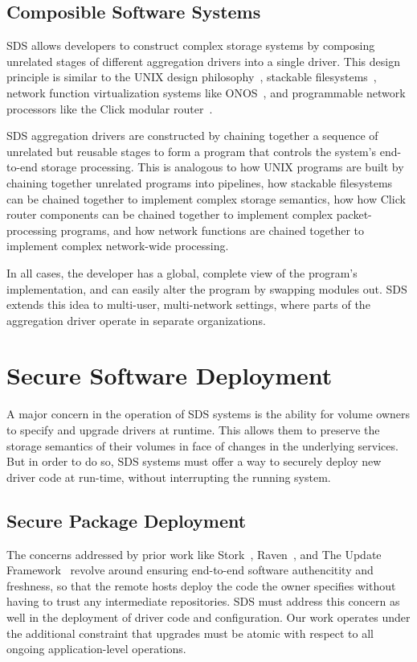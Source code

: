 \subsection{Composible Software Systems}

SDS allows developers to construct complex storage systems by composing
unrelated stages of different aggregation drivers into a single driver.
This design principle is similar to the UNIX design philosophy~\cite{unix-design-philosophy},
stackable filesystems~\cite{FUSE-stack}, network function virtualization systems
like ONOS~\cite{onos},
and programmable network processors like the Click modular router~\cite{click-modular-router}.

SDS aggregation drivers are constructed by chaining together a sequence of
unrelated but reusable stages to form a program that controls the system's
end-to-end storage processing.  This is analogous to how UNIX programs are built
by chaining together unrelated programs into pipelines, how stackable
filesystems can be chained together to implement complex storage semantics, how
how Click router components can be chained together to implement complex
packet-processing programs, and how network functions are chained together to
implement complex network-wide processing.

In all cases, the developer has a global,
complete view of the program's implementation, and can easily alter the
program by swapping modules out.  SDS extends this idea to
multi-user, multi-network settings, where parts of the
aggregation driver operate in separate organizations.

\section{Secure Software Deployment}

A major concern in the operation of SDS systems is the ability for volume owners
to specify and upgrade drivers at runtime.  This allows them to preserve the
storage semantics of their volumes in face of changes in the underlying
services.  But in order to do so, SDS systems must offer a way to securely
deploy new driver code at run-time, without interrupting the running system.

\subsection{Secure Package Deployment}

The concerns addressed by prior work like Stork~\cite{stork},
Raven~\cite{raven}, and The Update Framework~\cite{TUF}
revolve around ensuring end-to-end software authencitity and
freshness, so that the remote hosts deploy the code the owner specifies without
having to trust any intermediate repositories.
SDS must address this concern as
well in the deployment of driver code and configuration.  Our work
operates under the additional constraint that upgrades must be atomic with
respect to all ongoing application-level operations.

